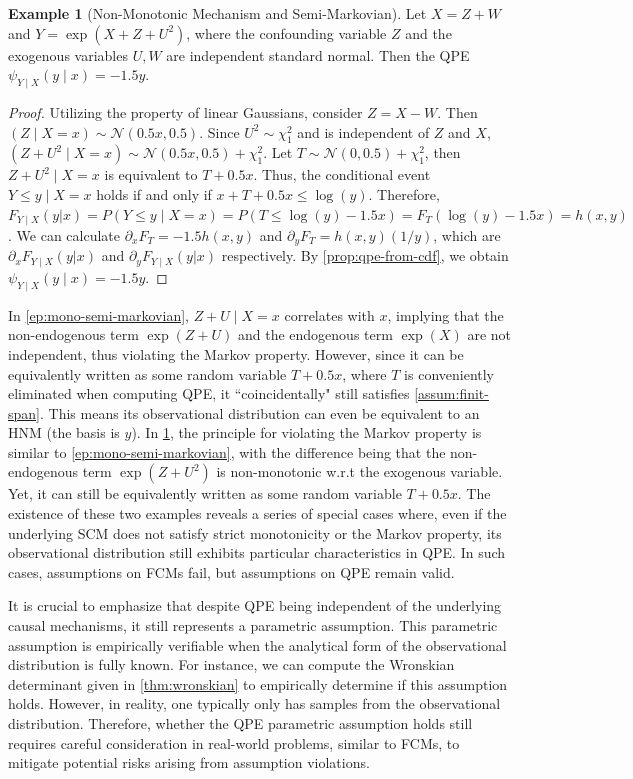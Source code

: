\documentclass{article}
\theoremstyle{plain}
\theoremstyle{definition}
\newtheorem{example}[theorem]{Example}
\theoremstyle{remark}
\begin{document}
\begin{example}[Non-Monotonic Mechanism and Semi-Markovian]
\label{ep:non-mono-semi-markovian}
Let $X=Z+W$ and $Y=\exp(X+Z+U^2)$, where the confounding variable $Z$ and the exogenous variables $U,W$ are independent standard normal. Then the QPE $\psi_{Y\mid X}(y\!\mid\!x)=-1.5y$.
\end{example}
\begin{proof}
Utilizing the property of linear Gaussians, consider $Z=X-W$. Then $(Z\!\mid\!X=x)\sim\mathcal{N}(0.5x,0.5)$. Since $U^2\sim\chi_1^2$ and is independent of $Z$ and $X$, $(Z+U^2\!\mid\!X=x)\sim\mathcal{N}(0.5x,0.5)+\chi_1^2$. Let $T\sim\mathcal{N}(0,0.5)+\chi_1^2$, then $Z+U^2\!\mid\!X=x$ is equivalent to $T+0.5x$. Thus, the conditional event $Y\le y\mid X=x$ holds if and only if $x+T+0.5x\le\log(y)$. Therefore, $F_{Y\mid X}(y|x)=P(Y\le y\mid X=x)=P(T\le\log(y)-1.5x)=F_T(\log(y)-1.5x)=h(x,y)$. We can calculate $\partial_x F_T=-1.5h(x,y)$ and $\partial_y F_T=h(x,y)(1/y)$, which are $\partial_xF_{Y\mid X}(y|x)$ and $\partial_yF_{Y\mid X}(y|x)$ respectively. By \cref{prop:qpe-from-cdf}, we obtain $\psi_{Y\mid X}(y\!\mid\!x)=-1.5y$.
\end{proof}

In \cref{ep:mono-semi-markovian}, $Z+U\!\mid\!X=x$ correlates with $x$, implying that the non-endogenous term $\exp(Z+U)$ and the endogenous term $\exp(X)$ are not independent, thus violating the Markov property. However, since it can be equivalently written as some random variable $T+0.5x$, where $T$ is conveniently eliminated when computing QPE, it ``coincidentally" still satisfies \cref{assum:finit-span}. This means its observational distribution can even be equivalent to an HNM (the basis is $y$). In \cref{ep:non-mono-semi-markovian}, the principle for violating the Markov property is similar to \cref{ep:mono-semi-markovian}, with the difference being that the non-endogenous term $\exp(Z+U^2)$ is non-monotonic w.r.t the exogenous variable. Yet, it can still be equivalently written as some random variable $T+0.5x$. The existence of these two examples reveals a series of special cases where, even if the underlying SCM does not satisfy strict monotonicity or the Markov property, its observational distribution still exhibits particular characteristics in QPE. In such cases, assumptions on FCMs fail, but assumptions on QPE remain valid.

It is crucial to emphasize that despite QPE being independent of the underlying causal mechanisms, it still represents a parametric assumption. This parametric assumption is empirically verifiable when the analytical form of the observational distribution is fully known. For instance, we can compute the Wronskian determinant given in \cref{thm:wronskian} to empirically determine if this assumption holds. However, in reality, one typically only has samples from the observational distribution. Therefore, whether the QPE parametric assumption holds still requires careful consideration in real-world problems, similar to FCMs, to mitigate potential risks arising from assumption violations.%
\newpage
\end{document}

